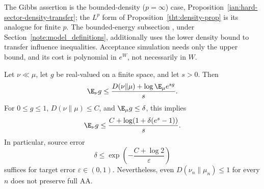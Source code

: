 The Gibbs assertion is the bounded-density (\(p=\infty\)) case,
Proposition~\ref{ian:hard-sector-density-transfer}; the \(L^p\) form of
Proposition~\ref{tht:density-prop} is its analogue for finite \(p\). The bounded-energy subsection
,
under Section~\ref{note:model_definitions}, additionally uses the lower
density bound to transfer influence inequalities. Acceptance simulation
needs only the upper bound, and its cost is polynomial in \(e^{W}\),
not necessarily in \(W\).

\begin{proposition}
\label{ian:hard-sector-kl-transfer}
Let \(\nu\ll\mu\), let \(g\) be real-valued on a finite space, and
let \(s>0\). Then
\[
 \E_\nu g
 \le\frac{D(\nu\|\mu)+\log\E_\mu e^{sg}}s.
\]
For \(0\le g\le1\), \(D(\nu\|\mu)\le C\), and
\(\E_\mu g\le\delta\), this implies
\[
 \E_\nu g
 \le\frac{C+\log(1+\delta(e^s-1))}{s}.
\]
In particular, source error
\[
 \delta\le\exp\left(-\frac{C+\log2}{\varepsilon}\right)
\]
suffices for target error \(\varepsilon\in(0,1)\).
Nevertheless, even \(D(\nu_n\|\mu_n)\le1\) for every \(n\) does not
preserve full AA.
\end{proposition}

